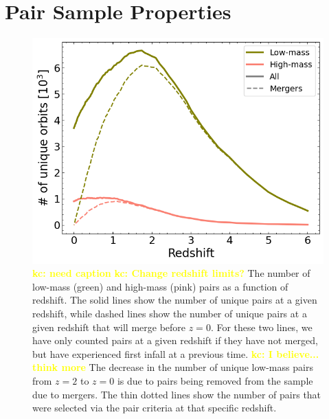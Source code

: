 \documentclass[twocolumn,linenumbers]{aastex631}
\newcommand{\kc}[1]{\textcolor{yellow}{\textbf{kc: #1}} }
\begin{document}


\section{Pair Sample Properties}
\begin{figure}[htb]
    \begin{center}
    \includegraphics[width=\columnwidth]{plots/bet-on-it/6_paircount.png}
    \caption{\kc{need caption}\kc{Change redshift limits?} The number of low-mass (green) and high-mass (pink) pairs as a function of redshift. The solid lines show the number of unique pairs at a given redshift, while dashed lines show the number of unique pairs at a given redshift that will merge before $z=0$.
    For these two lines, we have only counted pairs at a given redshift if they have not merged, but have experienced first infall at a previous time. 
    \kc{I believe... think more} The decrease in the number of unique low-mass pairs from $z=2$ to $z=0$ is due to pairs being removed from the sample due to mergers.
    The thin dotted lines show the number of pairs that were selected via the pair criteria at that specific redshift. 
    }
    \label{fig:num-pairs}
    \end{center}
\end{figure}
\end{document}

